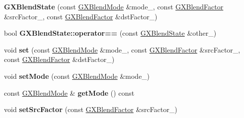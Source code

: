 \begin{DoxyCompactItemize}
\item 
{\bfseries G\+X\+Blend\+State} (const \hyperlink{class_i_dream_sky_1_1_g_x_blend_mode}{G\+X\+Blend\+Mode} \&mode\+\_\+, const \hyperlink{class_i_dream_sky_1_1_g_x_blend_factor}{G\+X\+Blend\+Factor} \&src\+Factor\+\_\+, const \hyperlink{class_i_dream_sky_1_1_g_x_blend_factor}{G\+X\+Blend\+Factor} \&dst\+Factor\+\_\+)\hypertarget{class_i_dream_sky_1_1_g_x_blend_state_a38a1b24eef6427491f9cad4e22ba854b}{}\label{class_i_dream_sky_1_1_g_x_blend_state_a38a1b24eef6427491f9cad4e22ba854b}

\item 
bool {\bfseries G\+X\+Blend\+State\+::operator==} (const \hyperlink{class_i_dream_sky_1_1_g_x_blend_state}{G\+X\+Blend\+State} \&other\+\_\+)\hypertarget{class_i_dream_sky_1_1_g_x_blend_state_aa5fdd31c1a7579d1d7a3fcfc1e80b6ea}{}\label{class_i_dream_sky_1_1_g_x_blend_state_aa5fdd31c1a7579d1d7a3fcfc1e80b6ea}

\item 
void {\bfseries set} (const \hyperlink{class_i_dream_sky_1_1_g_x_blend_mode}{G\+X\+Blend\+Mode} \&mode\+\_\+, const \hyperlink{class_i_dream_sky_1_1_g_x_blend_factor}{G\+X\+Blend\+Factor} \&src\+Factor\+\_\+, const \hyperlink{class_i_dream_sky_1_1_g_x_blend_factor}{G\+X\+Blend\+Factor} \&dst\+Factor\+\_\+)\hypertarget{class_i_dream_sky_1_1_g_x_blend_state_ae23e7579b9e77ff0c019703ca62c44d4}{}\label{class_i_dream_sky_1_1_g_x_blend_state_ae23e7579b9e77ff0c019703ca62c44d4}

\item 
void {\bfseries set\+Mode} (const \hyperlink{class_i_dream_sky_1_1_g_x_blend_mode}{G\+X\+Blend\+Mode} \&mode\+\_\+)\hypertarget{class_i_dream_sky_1_1_g_x_blend_state_a778dd42d95bc2fa44d024c42d3026f58}{}\label{class_i_dream_sky_1_1_g_x_blend_state_a778dd42d95bc2fa44d024c42d3026f58}

\item 
const \hyperlink{class_i_dream_sky_1_1_g_x_blend_mode}{G\+X\+Blend\+Mode} \& {\bfseries get\+Mode} () const \hypertarget{class_i_dream_sky_1_1_g_x_blend_state_a9025e756fbd077be555fad27266f14c1}{}\label{class_i_dream_sky_1_1_g_x_blend_state_a9025e756fbd077be555fad27266f14c1}

\item 
void {\bfseries set\+Src\+Factor} (const \hyperlink{class_i_dream_sky_1_1_g_x_blend_factor}{G\+X\+Blend\+Factor} \&src\+Factor\+\_\+)\hypertarget{class_i_dream_sky_1_1_g_x_blend_state_a2dbcfe28643ae82cfe729b5d338d0542}{}\label{class_i_dream_sky_1_1_g_x_blend_state_a2dbcfe28643ae82cfe729b5d338d0542}


\end{DoxyCompactItemize}
